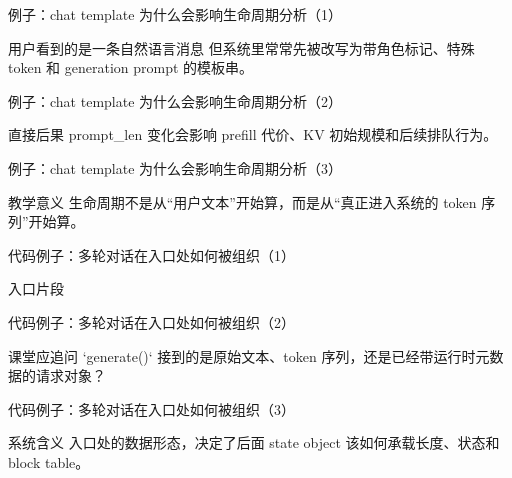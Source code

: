 \begin{frame}{例子：chat template 为什么会影响生命周期分析（1）}
\begin{block}{用户看到的是一条自然语言消息}
    但系统里常常先被改写为带角色标记、特殊 token 和 generation prompt 的模板串。
  \end{block}
\end{frame}

\begin{frame}{例子：chat template 为什么会影响生命周期分析（2）}
\begin{block}{直接后果}
    prompt\_len 变化会影响 prefill 代价、KV 初始规模和后续排队行为。
  \end{block}
\end{frame}

\begin{frame}{例子：chat template 为什么会影响生命周期分析（3）}
\begin{block}{教学意义}
    生命周期不是从“用户文本”开始算，而是从“真正进入系统的 token 序列”开始算。
  \end{block}
\end{frame}

\begin{frame}{代码例子：多轮对话在入口处如何被组织（1）}
\begin{block}{入口片段}
    {\ttfamily\small
    \par
    \par
    }
  \end{block}
\end{frame}

\begin{frame}{代码例子：多轮对话在入口处如何被组织（2）}
\begin{block}{课堂应追问}
    `generate()` 接到的是原始文本、token 序列，还是已经带运行时元数据的请求对象？
  \end{block}
\end{frame}

\begin{frame}{代码例子：多轮对话在入口处如何被组织（3）}
\begin{block}{系统含义}
    入口处的数据形态，决定了后面 state object 该如何承载长度、状态和 block table。
  \end{block}
\end{frame}


